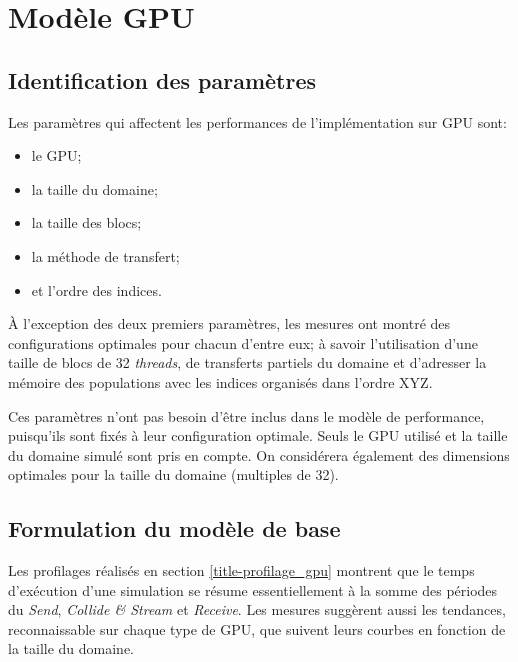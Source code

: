 \section{Modèle \acs{GPU}}
\subsection{Identification des paramètres}
Les paramètres qui affectent les performances de l'implémentation sur \acs{GPU} sont:
\begin{itemize}
\item le \acs{GPU};
\item la taille du domaine;
\item la taille des blocs;
\item la méthode de transfert;
\item et l'ordre des indices.
\end{itemize}
À l'exception des deux premiers paramètres, les mesures ont montré des configurations optimales pour chacun d'entre eux; à savoir l'utilisation d'une taille de blocs de 32 \textit{threads}, de transferts partiels du domaine et d'adresser la mémoire des populations avec les indices organisés dans l'ordre XYZ.

Ces paramètres n'ont pas besoin d'être inclus dans le modèle de performance, puisqu'ils sont fixés à leur configuration optimale. Seuls le \acs{GPU} utilisé et la taille du domaine simulé sont pris en compte. On considérera également des dimensions optimales pour la taille du domaine (multiples de 32).

\subsection{Formulation du modèle de base} \label{title-modele_performance}

\newcommand{\Time}[0]{T}
\newcommand{\cscoef}[0]{\Psi}
\newcommand{\scoef}[0]{\Gamma}
\newcommand{\rcoef}[0]{\digamma}



Les profilages réalisés en section \ref{title-profilage_gpu} montrent que le temps d'exécution d'une simulation se résume essentiellement à la somme des périodes du \textit{Send}, \textit{Collide \& Stream} et \textit{Receive}. Les mesures suggèrent aussi les tendances, reconnaissable sur chaque type de \acs{GPU}, que suivent leurs courbes en fonction de la taille du domaine.

